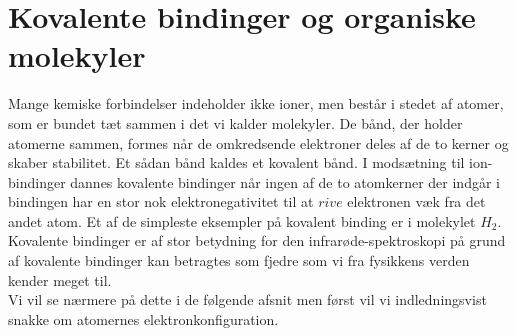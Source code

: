 \chapter{Kovalente bindinger og organiske molekyler}
Mange kemiske forbindelser indeholder ikke ioner, men består i stedet af atomer, som er bundet tæt sammen i det vi kalder molekyler. De bånd, der holder atomerne sammen, formes når de omkredsende elektroner deles af de to kerner og skaber stabilitet. Et sådan bånd kaldes et kovalent bånd. I modsætning til ion-bindinger dannes kovalente bindinger når ingen af de to atomkerner der indgår i bindingen har en stor nok elektronegativitet til at $rive$ elektronen væk fra det andet atom. Et af de simpleste eksempler på kovalent binding er i molekylet $H_2$. Kovalente bindinger er af stor betydning for den infrarøde-spektroskopi på grund af kovalente bindinger kan betragtes som fjedre som vi fra fysikkens verden kender meget til.
\\
Vi vil se nærmere på dette i de følgende afsnit men først vil vi indledningsvist snakke om atomernes elektronkonfiguration. 

